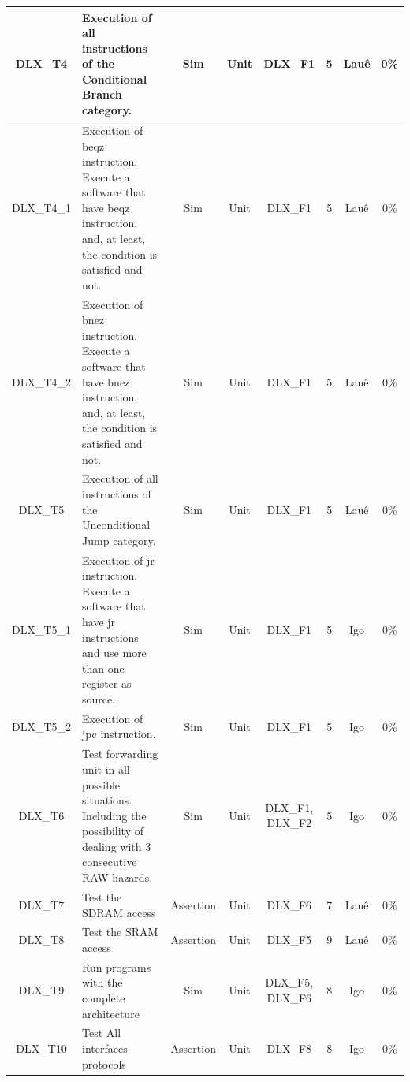 \documentclass{article}
\begin{document}
\begin{landscape}
\begin{center}
\begin{longtable}[pos]{| c | m{5cm} | c | c | c | c | c | c |}
      	DLX\_T4      & Execution of all instructions of the Conditional Branch category.   &	Sim & Unit & DLX\_F1 & 5 & Lauê & 0\% \\ \hline 
      	DLX\_T4\_1   & Execution of beqz instruction. Execute a software that have beqz instruction, and, at least, the condition is satisfied and not.   &	Sim & Unit & DLX\_F1 & 5 & Lauê & 0\% \\ \hline   
      	DLX\_T4\_2   & Execution of bnez instruction. Execute a software that have bnez instruction, and, at least, the condition is satisfied and not.   &	Sim & Unit & DLX\_F1 & 5 & Lauê & 0\% \\ \hline   
      	DLX\_T5      & Execution of all instructions of the Unconditional Jump category.  &	Sim & Unit & DLX\_F1 & 5 & Lauê & 0\% \\ \hline 
       	DLX\_T5\_1   & Execution of jr instruction. Execute a software that have jr instructions and use more than one register as source.   &	Sim & Unit & DLX\_F1 & 5 & Igo & 0\% \\ \hline   
       	DLX\_T5\_2   & Execution of jpc instruction.  &	Sim & Unit & DLX\_F1 & 5 & Igo & 0\% \\ \hline   
	DLX\_T6      & Test forwarding unit in all possible situations. Including the possibility of dealing with 3 consecutive RAW hazards.  &	Sim & Unit & DLX\_F1, DLX\_F2 & 5 & Igo & 0\% \\ \hline    
	DLX\_T7      & Test the SDRAM access  &	Assertion & Unit & DLX\_F6 & 7 & Lauê & 0\% \\ \hline        
	DLX\_T8      & Test the SRAM access  &	Assertion & Unit & DLX\_F5 & 9 & Lauê & 0\% \\ \hline        
	DLX\_T9      & Run programs with the complete architecture  &	Sim & Unit & DLX\_F5, DLX\_F6 & 8 & Igo & 0\% \\ \hline        
	DLX\_T10      & Test All interfaces protocols  & Assertion & Unit & DLX\_F8 & 8 & Igo & 0\% \\ \hline        

      \end{longtable}
    \end{center}		
  \end{landscape}
  
  \newpage
\end{document}

